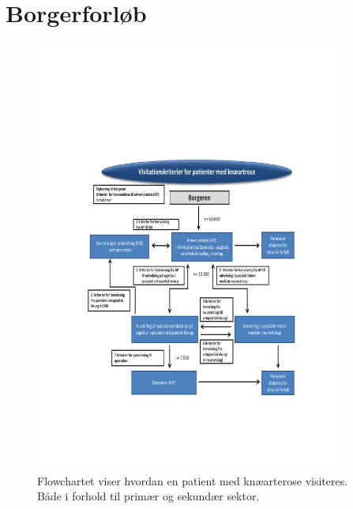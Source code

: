 \chapter{Borgerforløb}\vspace{-.75cm} \label{Borgerforloeb} 
\begin{figure}[H] 
	\begin{center}
		\includegraphics[width=0.9\textwidth]{rapportAfsnit/qBilag/Borgerforloeb}
	\end{center}
	\caption{Flowchartet viser hvordan en patient med knæarterose visiteres. Både i forhold til primær og sekundær sektor. \citep{brostrom2012}}
	\label{} 
\end{figure}